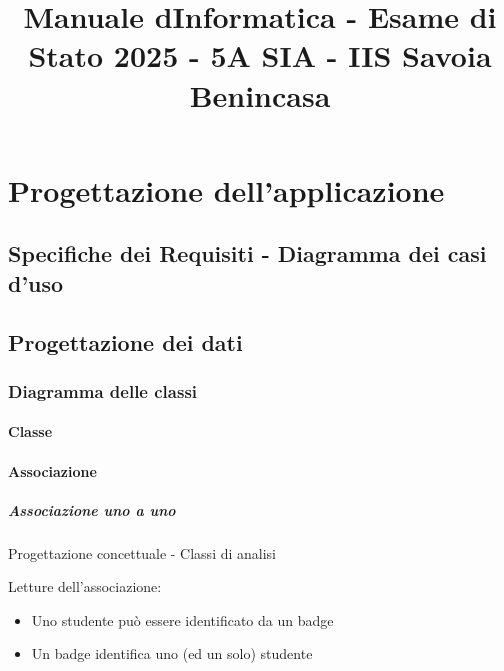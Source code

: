 \documentclass[italian,a4paper]{article}
\title{Manuale d\textquotesingle Informatica - Esame di Stato 2025 - 5A
SIA - IIS Savoia Benincasa}
\author{}
\date{}
\providecommand{\tightlist}{%
  \setlength{\itemsep}{0pt}\setlength{\parskip}{0pt}}
\begin{document}
\maketitle

{
\setcounter{tocdepth}{6}
\tableofcontents
}
\section{Progettazione
dell'applicazione}\label{progettazione-dellapplicazione}

\subsection{Specifiche dei Requisiti - Diagramma dei casi
d'uso}\label{specifiche-dei-requisiti---diagramma-dei-casi-duso}



\subsection{Progettazione dei dati}\label{progettazione-dei-dati}

\subsubsection{Diagramma delle classi}\label{diagramma-delle-classi}

\paragraph{Classe}\label{classe}




\paragraph{Associazione}\label{associazione}

\subparagraph{Associazione uno a uno}\label{associazione-uno-a-uno}

Progettazione concettuale - Classi di analisi



Letture dell'associazione:

\begin{itemize}
\tightlist
\item
  Uno studente può essere identificato da un badge
\item
  Un badge identifica uno (ed un solo) studente
\end{itemize}
\end{document}
